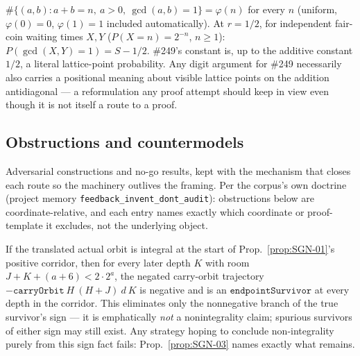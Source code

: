 \begin{prop}\label{prop:C1-inv}
$\#\{(a,b): a{+}b=n,\ a>0,\ \gcd(a,b)=1\}=\varphi(n)$ for every $n$ (uniform, $\varphi(0)=0$,
$\varphi(1)=1$ included automatically). At $r=1/2$, for independent fair-coin waiting times
$X,Y$ ($P(X{=}n)=2^{-n}$, $n\ge1$): $P(\gcd(X,Y)=1) = S - 1/2$. \#249's constant is, up to the
additive constant $1/2$, a literal lattice-point probability. Any digit argument for \#249
necessarily also carries a positional meaning about visible lattice points on the addition
antidiagonal — a reformulation any proof attempt should keep in view even though it is not itself
a route to a proof.
\ \ \\
\end{prop}

\subsection{Obstructions and countermodels}

Adversarial constructions and no-go results, kept with the mechanism that
closes each route so the machinery outlives the framing. Per the corpus's
own doctrine (project memory \texttt{feedback\_invent\_dont\_audit}): obstructions
below are coordinate-relative, and each entry names exactly which coordinate
or proof-template it excludes, not the underlying object.

\begin{obs}\label{prop:SGN-02}
If the translated actual orbit is integral at the start of Prop.~\ref{prop:SGN-01}'s positive
corridor, then for every later depth $K$ with room $J{+}K{+}(a{+}6)<2\cdot2^a$, the negated
carry-orbit trajectory $-\mathtt{carryOrbit}\ H\ (H{+}J)\ d\ K$ is negative and is an
$\mathtt{endpointSurvivor}$ at every depth in the corridor. This eliminates only the nonnegative
branch of the true survivor's sign — it is emphatically \emph{not} a nonintegrality claim;
spurious survivors of either sign may still exist. Any strategy hoping to conclude non-integrality
purely from this sign fact fails: Prop.~\ref{prop:SGN-03} names exactly what remains.
\ \ \\
\end{obs}

